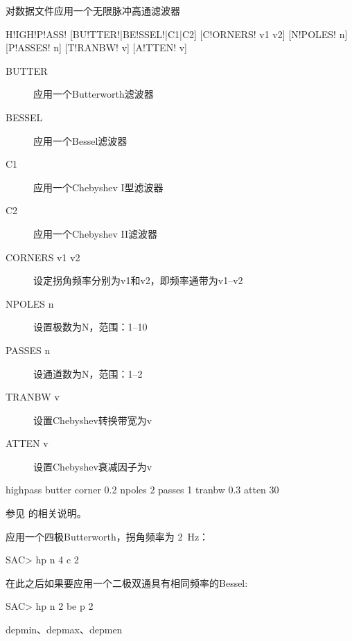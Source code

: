 \label{cmd:highpass}

对数据文件应用一个无限脉冲高通滤波器

\begin{SACSTX}
H!IGH!P!ASS! [BU!TTER!|BE!SSEL!|C1|C2] [C!ORNERS! v1 v2] [N!POLES! n] [P!ASSES! n]
    [T!RANBW! v] [A!TTEN! v]
\end{SACSTX}

\begin{description}
\item [BUTTER] 应用一个Butterworth滤波器
\item [BESSEL] 应用一个Bessel滤波器
\item [C1] 应用一个Chebyshev I型滤波器
\item [C2] 应用一个Chebyshev II滤波器
\item [CORNERS v1 v2] 设定拐角频率分别为v1和v2，即频率通带为v1--v2
\item [NPOLES n] 设置极数为N，范围：1--10
\item [PASSES n] 设通道数为N，范围：1--2
\item [TRANBW v] 设置Chebyshev转换带宽为v
\item [ATTEN v] 设置Chebyshev衰减因子为v
\end{description}

\begin{SACDFT}
highpass butter corner 0.2 npoles 2 passes 1 tranbw 0.3 atten 30
\end{SACDFT}

参见  的相关说明。

应用一个四极Butterworth，拐角频率为 \SI{2}{\Hz}：
\begin{SACCode}
SAC> hp n 4 c 2
\end{SACCode}

在此之后如果要应用一个二极双通具有相同频率的Bessel:
\begin{SACCode}
SAC> hp n 2 be p 2
\end{SACCode}

depmin、depmax、depmen

